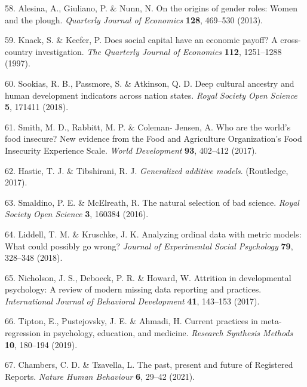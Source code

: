 \documentclass[english,man,floatsintext]{apa6}
\begin{document}
\leavevmode\hypertarget{ref-Alesina2013}{}%
58. Alesina, A., Giuliano, P. \& Nunn, N. On the origins of gender roles: Women and the plough. \emph{Quarterly Journal of Economics} \textbf{128}, 469--530 (2013).

\leavevmode\hypertarget{ref-Knack1997}{}%
59. Knack, S. \& Keefer, P. Does social capital have an economic payoff? A cross-country investigation. \emph{The Quarterly Journal of Economics} \textbf{112}, 1251--1288 (1997).

\leavevmode\hypertarget{ref-Sookias2018}{}%
60. Sookias, R. B., Passmore, S. \& Atkinson, Q. D. Deep cultural ancestry and human development indicators across nation states. \emph{Royal Society Open Science} \textbf{5}, 171411 (2018).

\leavevmode\hypertarget{ref-Smith2017}{}%
61. Smith, M. D., Rabbitt, M. P. \& Coleman- Jensen, A. Who are the world's food insecure? New evidence from the Food and Agriculture Organization's Food Insecurity Experience Scale. \emph{World Development} \textbf{93}, 402--412 (2017).

\leavevmode\hypertarget{ref-Hastie2017}{}%
62. Hastie, T. J. \& Tibshirani, R. J. \emph{Generalized additive models}. (Routledge, 2017).

\leavevmode\hypertarget{ref-Smaldino2016}{}%
63. Smaldino, P. E. \& McElreath, R. The natural selection of bad science. \emph{Royal Society Open Science} \textbf{3}, 160384 (2016).

\leavevmode\hypertarget{ref-Liddell2018}{}%
64. Liddell, T. M. \& Kruschke, J. K. Analyzing ordinal data with metric models: What could possibly go wrong? \emph{Journal of Experimental Social Psychology} \textbf{79}, 328--348 (2018).

\leavevmode\hypertarget{ref-Nicholson2017}{}%
65. Nicholson, J. S., Deboeck, P. R. \& Howard, W. Attrition in developmental psychology: A review of modern missing data reporting and practices. \emph{International Journal of Behavioral Development} \textbf{41}, 143--153 (2017).

\leavevmode\hypertarget{ref-Tipton2019}{}%
66. Tipton, E., Pustejovsky, J. E. \& Ahmadi, H. Current practices in meta-regression in psychology, education, and medicine. \emph{Research Synthesis Methods} \textbf{10}, 180--194 (2019).

\leavevmode\hypertarget{ref-Chambers2021}{}%
67. Chambers, C. D. \& Tzavella, L. The past, present and future of Registered Reports. \emph{Nature Human Behaviour} \textbf{6}, 29--42 (2021).
\end{document}
